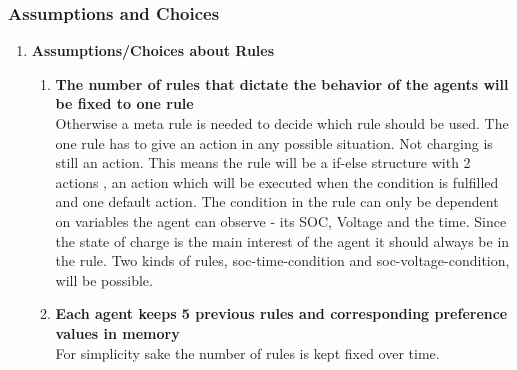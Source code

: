 \documentclass[a4paper]{article}
\begin{document}
\subsubsection{Assumptions and Choices}

\begin{enumerate}
 \item \textbf{Assumptions/Choices  about Rules} \begin{enumerate}
                                         \item \textbf{The number of rules that dictate the behavior of the agents will be 
                                         fixed to one rule} \\
                                         Otherwise a meta rule is needed to decide which rule should be used. 
					 The one rule has to give an action in any possible situation. Not charging is still
					 an action. This means the rule will be a if-else structure with 2 actions , 
					 an action which will be executed when the condition is fulfilled and one default 
					 action.
					 The condition in the rule can only be dependent on variables the agent can observe - 
					 its SOC, Voltage and the time. Since the state of charge is the main interest of the
					 agent it should always be in the rule. Two kinds of rules, soc-time-condition and 
					 soc-voltage-condition, will be possible.
					 \item \textbf{Each agent keeps  5 previous rules and corresponding preference 
					 values in memory }\\
					 For simplicity sake the number of rules is kept fixed over time.
					 
					 \end{enumerate}
					 

\end{enumerate}
\end{document}
